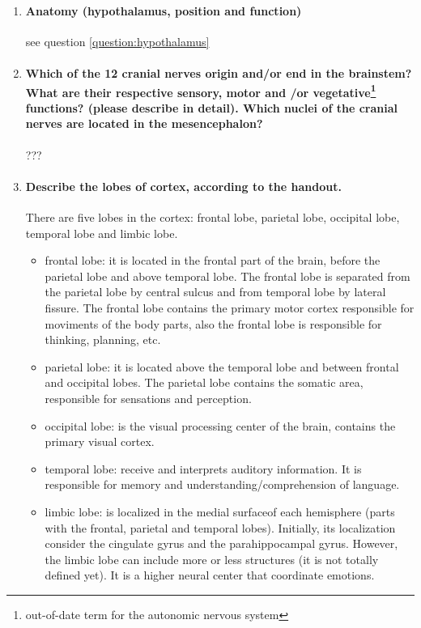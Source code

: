 \documentclass[12pt,article,oneside,a4paper]{memoir}
\begin{document}
\begin{enumerate}
\item \paragraph{Anatomy (hypothalamus, position and function)}
see question \ref{question:hypothalamus}

\item \paragraph{Which of the 12 cranial nerves origin and/or end in the brainstem? What are their respective sensory, motor and /or vegetative\protect\footnote{out-of-date term for the autonomic nervous system} functions? (please describe in detail). Which nuclei of the cranial nerves are located in the mesencephalon?}
???

\item \paragraph{Describe the lobes of cortex, according to the handout.} 
There are five lobes in the cortex: frontal lobe, parietal lobe, occipital lobe, temporal lobe and limbic lobe.
\begin{itemize}
\item frontal lobe: it is located in the frontal part of the brain, before the parietal lobe and above temporal lobe. The frontal lobe is separated from the parietal lobe by central sulcus and from temporal lobe by lateral fissure. The frontal lobe contains the primary motor cortex responsible for moviments of the body parts, also the frontal lobe is responsible for thinking, planning, etc.
\item parietal lobe: it is located above the temporal lobe and between frontal and occipital lobes. The parietal lobe contains the somatic area, responsible for sensations and perception.
\item occipital lobe: is the visual processing center of the brain, contains the primary visual cortex.
\item temporal lobe: receive and interprets auditory information. It is responsible for memory and understanding/comprehension of language.
\item limbic lobe: is localized in the medial surfaceof each hemisphere (parts with the frontal, parietal and temporal lobes). Initially, its localization consider the cingulate gyrus and the parahippocampal gyrus. However, the limbic lobe can include more or less structures (it is not totally defined yet). It is a higher neural center that coordinate emotions.
\end{itemize}


\end{enumerate}
\end{document}
